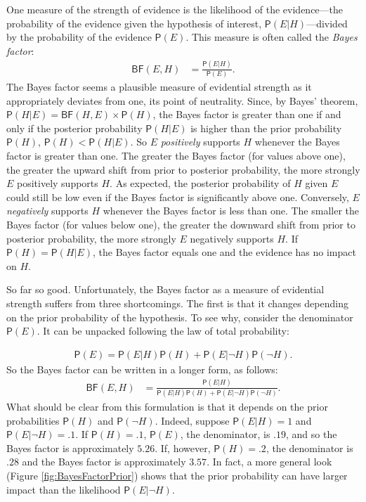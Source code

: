 \documentclass[
  10pt,
  dvipsnames,enabledeprecatedfontcommands]{scrartcl}
\newcommand{\n}{\neg}
\newcommand{\pr}[1]{\mathsf{P}(#1)}
\begin{document}
\label{sec:lr}

One measure of the strength of evidence is the likelihood of the
evidence---the probability of the evidence given the hypothesis of
interest, \(\pr{E \vert H}\)---divided by the probability of the
evidence \(\pr{E}\). This measure is often called the
\emph{Bayes factor}: \begin{align}\label{eq:BF}
\tag{BF}
\mathsf{BF}(E,H) & = \frac{\pr{E \vert H}}{\pr{E}}.
\end{align} \noindent The Bayes factor seems a plausible measure of
evidential strength as it appropriately deviates from one, its point of
neutrality. Since, by Bayes' theorem,
\(\pr{H \vert E} = \mathsf{BF}(H, E) \times \pr{H}\), the Bayes factor
is greater than one if and only if the posterior probability
\(\pr{H \vert E}\) is higher than the prior probability \(\pr{H}\),
\(\pr{H}<\pr{H\vert E}\). So \(E\) \textit{positively} supports \(H\)
whenever the Bayes factor is greater than one. The greater the Bayes
factor (for values above one), the greater the upward shift from prior
to posterior probability, the more strongly \(E\) positively supports
\(H\). As expected, the posterior probability of \(H\) given \(E\) could
still be low even if the Bayes factor is significantly above one.
Conversely, \(E\) \textit{negatively} supports \(H\) whenever the Bayes
factor is less than one. The smaller the Bayes factor (for values below
one), the greater the downward shift from prior to posterior
probability, the more strongly \(E\) negatively supports \(H\). If
\(\pr{H}=\pr{H\vert E}\), the Bayes factor equals one and the evidence
has no impact on \(H\).

So far so good. Unfortunately, the Bayes factor as a measure of
evidential strength suffers from three shortcomings. The first is that
it changes depending on the prior probability of the hypothesis. To see
why, consider the denominator \(\pr{E}\). It can be unpacked following
the law of total probability:

\vspace{-3mm}

\begin{align} \label{eq:lotpSimple}
\pr{E}= \pr{E \vert H} \pr{H}+\pr{E \vert \neg H} \pr{\neg H}.
\end{align} \noindent  So the Bayes factor can be written in a longer
form, as follows: \begin{align}\label{eq:BFlotp}
\mathsf{BF}(E,H) & = \frac{\pr{E \vert H}}{\pr{E \vert H} \pr{H}+\pr{E \vert \neg H} \pr{\neg H}}.
\end{align} \noindent What should be clear from this formulation is that
it depends on the prior probabilities \(\pr{H}\) and \(\pr{\neg H}\).
Indeed, suppose \(\pr{E \vert H} = 1\) and \(\pr{E \vert \neg H} = .1\).
If \(\pr{H}=.1\), \(\pr{E}\), the denominator, is \(.19\), and so the
Bayes factor is approximately \(5.26\). If, however, \(\pr{H} =.2\), the
denominator is \(.28\) and the Bayes factor is approximately \(3.57\).
In fact, a more general look (Figure \ref{fig:BayesFactorPrior}) shows
that the prior probability can have larger impact than the likelihood
\(\pr{E \vert \n H}\).
\end{document}
